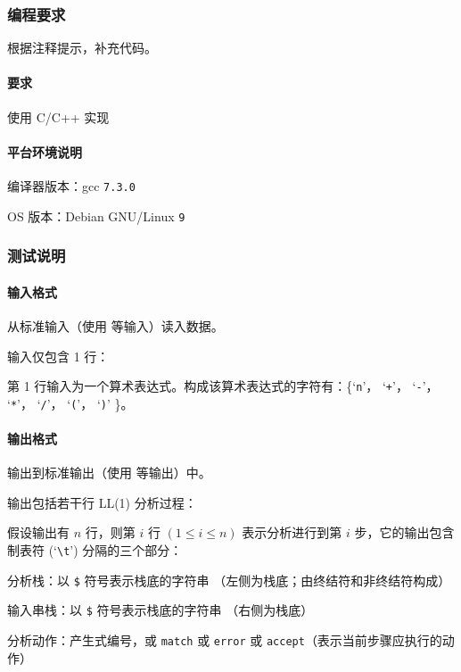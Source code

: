 \subsubsection{编程要求}

根据注释提示，补充代码。
\paragraph{要求} 使用 C/C++ 实现

\paragraph{平台环境说明}
\begin{compactitem}
    \item 编译器版本：gcc \texttt{7.3.0}
    \item OS 版本：Debian GNU/Linux \texttt{9}
\end{compactitem}

\subsubsection{测试说明}

\paragraph{输入格式} 从标准输入（使用  等输入）读入数据。

输入仅包含 1 行：\begin{compactitem}
    \item 第 1 行输入为一个算术表达式。构成该算术表达式的字符有：\{`\verb|n|'， `\verb|+|'， `\verb|-|'， `\verb|*|'， `\verb|/|'， `\verb|(|'， `\verb|)|' \}。
\end{compactitem}

\paragraph{输出格式} 输出到标准输出（使用  等输出）中。

输出包括若干行 LL(1) 分析过程：

假设输出有 $n$ 行，则第 $i$ 行 $(1\leq i \leq n)$ 表示分析进行到第 $i$ 步，它的输出包含制表符 (`\verb|\t|') 分隔的三个部分：\begin{compactitem}
    \item 分析栈：以 \verb|$| 符号表示栈底的字符串 （左侧为栈底；由终结符和非终结符构成）
    \item 输入串栈：以 \verb|$| 符号表示栈底的字符串 （右侧为栈底）
    \item 分析动作：产生式编号，或 \texttt{match} 或 \texttt{error} 或 \texttt{accept}（表示当前步骤应执行的动作）
\end{compactitem}

